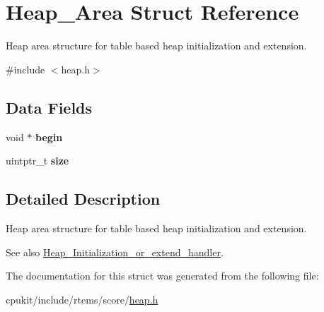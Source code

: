 \hypertarget{structHeap__Area}{}\section{Heap\+\_\+\+Area Struct Reference}
\label{structHeap__Area}


Heap area structure for table based heap initialization and extension.  




{\ttfamily \#include $<$heap.\+h$>$}

\subsection*{Data Fields}
\begin{DoxyCompactItemize}
\item 
\mbox{\label{structHeap__Area_a1425c59da46f4ec4d901b25c216dbcc6}} 
void $\ast$ {\bfseries begin}
\item 
\mbox{\label{structHeap__Area_a7d324f4eae0a46c08b0d1c0fd91b77c4}} 
uintptr\+\_\+t {\bfseries size}
\end{DoxyCompactItemize}


\subsection{Detailed Description}
Heap area structure for table based heap initialization and extension. 

\begin{DoxySeeAlso}{See also}
\mbox{\hyperlink{group__RTEMSScoreHeap_ga8953b692d39ca1c8a2780e9e8e2d9b1f}{Heap\+\_\+\+Initialization\+\_\+or\+\_\+extend\+\_\+handler}}. 
\end{DoxySeeAlso}


The documentation for this struct was generated from the following file\+:\begin{DoxyCompactItemize}
\item 
cpukit/include/rtems/score/\mbox{\hyperlink{heap_8h}{heap.\+h}}\end{DoxyCompactItemize}
